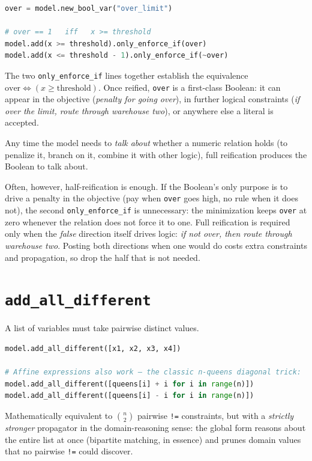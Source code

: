 \begin{lstlisting}[language=Python]
over = model.new_bool_var("over_limit")

# over == 1   iff   x >= threshold
model.add(x >= threshold).only_enforce_if(over)
model.add(x <= threshold - 1).only_enforce_if(~over)
\end{lstlisting}

The two \lstinline!only_enforce_if! lines together
establish the equivalence
\(\text{over} \Leftrightarrow (x \ge \text{threshold})\). Once reified,
\lstinline!over! is a first-class Boolean: it can appear
in the objective (\emph{penalty for going over}), in further logical
constraints (\emph{if over the limit, route through warehouse two}), or
anywhere else a literal is accepted.

Any time the model needs to \emph{talk about} whether a numeric relation
holds (to penalize it, branch on it, combine it with other logic),
full reification produces the Boolean to talk about.

Often, however, half-reification is enough. If the Boolean's only
purpose is to drive a penalty in the objective (pay when
\lstinline!over! goes high, no rule when it does not),
the second \lstinline!only_enforce_if! is unnecessary:
the minimization keeps \lstinline!over! at zero whenever
the relation does not force it to one. Full reification is required only
when the \emph{false} direction itself drives logic: \emph{if not
over, then route through warehouse two}. Posting both directions when
one would do costs extra constraints and propagation, so drop the half
that is not needed.

\section{\texorpdfstring{\texttt{add\_all\_different}}{add\_all\_different}}\label{sec:7.5}

A list of variables must take pairwise distinct values.

\begin{lstlisting}[language=Python]
model.add_all_different([x1, x2, x3, x4])

# Affine expressions also work — the classic n-queens diagonal trick:
model.add_all_different([queens[i] + i for i in range(n)])
model.add_all_different([queens[i] - i for i in range(n)])
\end{lstlisting}

Mathematically equivalent to \(\binom{n}{2}\) pairwise
\passthrough{\lstinline"!="} constraints, but with a \emph{strictly
stronger} propagator in the domain-reasoning sense: the global form
reasons about the entire list at once (bipartite matching, in essence)
and prunes domain values that no pairwise
\passthrough{\lstinline"!="} could discover.

